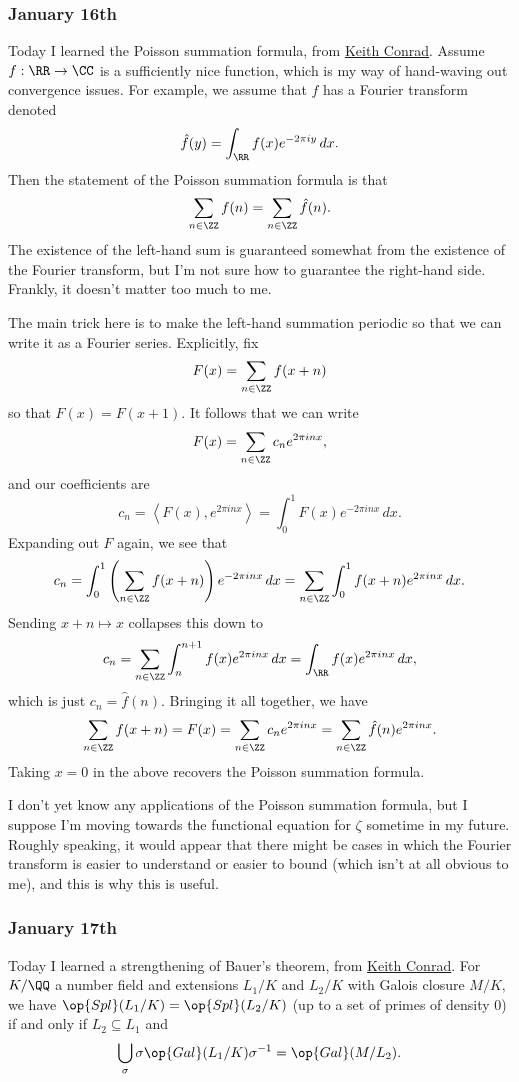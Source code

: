 \subsubsection{January 16th}
Today I learned the Poisson summation formula, from \href{https://kconrad.math.uconn.edu/blurbs/grouptheory/charthy.pdf}{Keith Conrad}. Assume $f:\RR\to\CC$ is a sufficiently nice function, which is my way of hand-waving out convergence issues. For example, we assume that $f$ has a Fourier transform denoted
\[\hat f(y)=\int_\RR f(x)e^{-2\pi iy}\,dx.\]
Then the statement of the Poisson summation formula is that
\[\sum_{n\in\ZZ}f(n)=\sum_{n\in\ZZ}\hat f(n).\]
The existence of the left-hand sum is guaranteed somewhat from the existence of the Fourier transform, but I'm not sure how to guarantee the right-hand side. Frankly, it doesn't matter too much to me.

The main trick here is to make the left-hand summation periodic so that we can write it as a Fourier series. Explicitly, fix
\[F(x)=\sum_{n\in\ZZ}f(x+n)\]
so that $F(x)=F(x+1).$ It follows that we can write
\[F(x)=\sum_{n\in\ZZ}c_ne^{2\pi inx},\]
and our coefficients are
\[c_n=\left\langle F(x),e^{2\pi inx}\right\rangle=\int_0^1F(x)e^{-2\pi inx}\,dx.\]
Expanding out $F$ again, we see that
\[c_n=\int_0^1\left(\sum_{n\in\ZZ}f(x+n)\right)e^{-2\pi inx}\,dx=\sum_{n\in\ZZ}\int_0^1f(x+n)e^{2\pi inx}\,dx.\]
Sending $x+n\mapsto x$ collapses this down to
\[c_n=\sum_{n\in\ZZ}\int_n^{n+1}f(x)e^{2\pi inx}\,dx=\int_\RR f(x)e^{2\pi inx}\,dx,\]
which is just $c_n=\hat f(n).$ Bringing it all together, we have
\[\sum_{n\in\ZZ}f(x+n)=F(x)=\sum_{n\in\ZZ}c_ne^{2\pi inx}=\sum_{n\in\ZZ}\hat f(n)e^{2\pi inx}.\]
Taking $x=0$ in the above recovers the Poisson summation formula.

I don't yet know any applications of the Poisson summation formula, but I suppose I'm moving towards the functional equation for $\zeta$ sometime in my future. Roughly speaking, it would appear that there might be cases in which the Fourier transform is easier to understand or easier to bound (which isn't at all obvious to me), and this is why this is useful.

\subsubsection{January 17th}
Today I learned a strengthening of Bauer's theorem, from \href{https://kconrad.math.uconn.edu/blurbs/gradnumthy/chebappn.pdf}{Keith Conrad}. For $K/\QQ$ a number field and extensions $L_1/K$ and $L_2/K$ with Galois closure $M/K,$ we have $\op{Spl}(L_1/K)=\op{Spl}(L_2/K)$ (up to a set of primes of density $0$) if and only if $L_2\subseteq L_1$ and
\[\bigcup_\sigma\sigma\op{Gal}(L_1/K)\sigma^{-1}=\op{Gal}(M/L_2).\]


